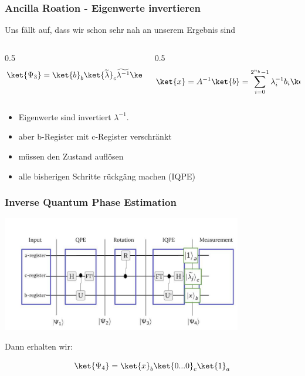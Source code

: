 \begin{frame}
    \frametitle{Ancilla Roation - Eigenwerte invertieren}

    Uns fällt auf, dass wir schon sehr nah an unserem Ergebnis sind
    \begin{columns}[c]
        \begin{column}{0.5\hsize}\centering
        $$\ket{\Psi_3} = \ket{b}_b \ket{\widetilde{\lambda}}_c \widetilde{\lambda^{-1}} \ket{1}_a$$
        \end{column}
        \begin{column}{0.5\hsize}
        $$\ket{x} =  A^{-1} \ket{b} = \sum_{i=0}^{2^{n_b}-1} \lambda_i^{-1} b_i\ket{u_i}$$
        \end{column}
    \end{columns}

    \hfil

    \hfil

    \begin{itemize}
        \item Eigenwerte sind invertiert $\lambda^{-1}$.
        \item aber b-Register mit c-Register verschränkt
        \item müssen den Zustand auflösen 
        \item alle bisherigen Schritte rückgäng machen (IQPE)
    \end{itemize}



\end{frame}


\begin{frame}

    \frametitle{Inverse Quantum Phase Estimation}
    \begin{center}
    \includegraphics[width=10.5cm]{img/hhl_circuit/hhl_circuit_4.jpg}
    \end{center}

    Dann erhalten wir:

    $$\ket{\Psi_4} = \ket{x}_b \ket{0...0}_c\ket{1}_a$$


\end{frame}

